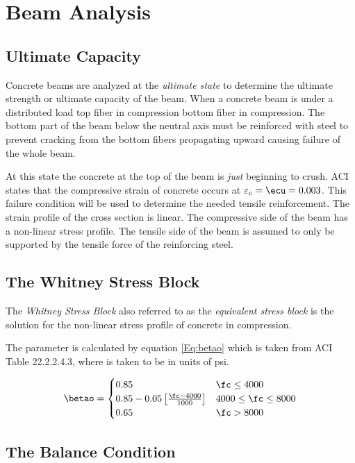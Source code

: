
\section{Beam Analysis}
\subsection{Ultimate Capacity}
Concrete beams are analyzed at the \textit{ultimate state} to determine the ultimate strength or ultimate capacity of the beam. When a concrete beam is under a distributed load top fiber in compression bottom fiber in compression. The bottom part of the beam below the neutral axis must be reinforced with steel to prevent cracking from the bottom fibers propagating upward causing failure of the whole beam. 

At this state the concrete at the top of the beam is \textit{just} beginning to crush. ACI states that the compressive strain of concrete occurs at $\ep_c=\ecu=0.003$. This failure condition will be used to determine the needed tensile reinforcement. The strain profile of the cross section is linear. The compressive side of the beam has a non-linear stress profile. The tensile side of the beam is assumed to only be supported by the tensile force of the reinforcing steel.


\subsection{The Whitney Stress Block}
The \textit{Whitney Stress Block} also referred to as the \textit{equivalent stress block} is the solution for the non-linear stress profile of concrete in compression.

The parameter \betao is calculated by equation \ref{Eq:betao} which is taken from ACI Table 22.2.2.4.3, where \fc  is taken to be in units of psi.

\begin{align}
	\betao
	=
	\begin{cases}
		0.85 & \fc \leq 4000 \\
		0.85-0.05\left[\frac{\fc-4000}{1000}\right] & 4000 \leq\fc\leq 8000 \\
		0.65 & \fc > 8000
	\end{cases}
	\label{Eq:betao}
\end{align}



\subsection{The Balance Condition}

